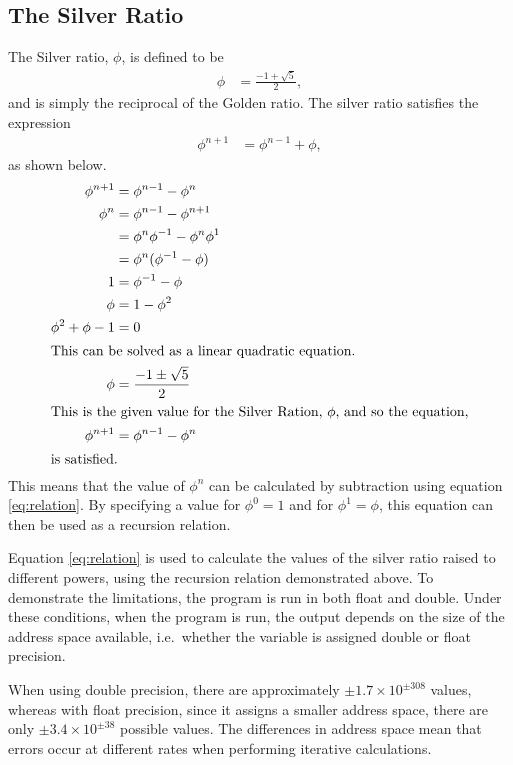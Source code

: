 \documentclass[11pt]{article} %
\begin{document}
	\subsection{The Silver Ratio}
		The Silver ratio, $\phi$, is defined to be
			\begin{align}
				\phi &= \frac{-1 + \sqrt{5}}{2},
			\end{align}
		and is simply the reciprocal of the Golden ratio. The silver ratio satisfies the expression
			\begin{align}
				\phi^{n+1} &= \phi^{n-1} + \phi, \label{eq:relation}
			\end{align}
		as shown below.
			\begin{align*}
				\phi^{n+1} &= \phi^{n-1} - \phi^n  \\
				\phi^n &= \phi^{n-1} - \phi^{n+1}  \\
					&= \phi^n\phi^{{}-1} - \phi^n\phi^1 \\
					&= \phi^n (\phi^{-1} - \phi) \\
				1 &= \phi^{-1} - \phi \\
				\phi &= 1 - \phi^2\\
				\phi^2 + \phi -1 &= 0\\
				\shortintertext{This can be solved as a linear quadratic equation.}
				\phi &= \frac{-1 \pm \sqrt{5}}{2}\\
				\shortintertext{This is the given value for the Silver Ration, $\phi$, and so the equation,}
				\phi^{n+1} &= \phi^{n-1} - \phi^n  \\
				\shortintertext{is satisfied.}
			\end{align*}
		This means that the value of $\phi^n$ can be calculated by subtraction using equation \ref{eq:relation}. By specifying a value for $\phi^0=1$ and for $\phi^1=\phi$, this equation can then be used as a recursion relation.

		Equation \ref{eq:relation} is used to calculate the values of the silver ratio raised to different powers, using the recursion relation demonstrated above. To demonstrate the limitations, the program is run in both float and double. Under these conditions, when the program is run, the output depends on the size of the address space available, i.e.\ whether the variable is assigned double or float precision.

		When using double precision, there are approximately $\pm1.7\times10^{\pm308}$ values, whereas with float precision, since it assigns a smaller address space, there are only $\pm3.4\times10^{\pm38}$ possible values. The differences in address space mean that errors occur at different rates when performing iterative calculations.
\end{document}
